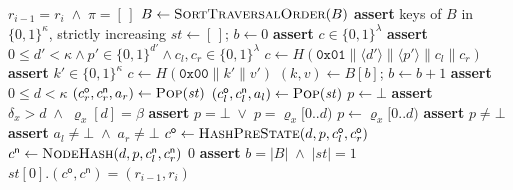 \documentclass[twocolumn]{article}
\begin{document}
\begin{algorithm}[H]
  \caption{Stack-machine verification of the RSMT consistency proof, complete}\label{alg:stackverify}
  \scriptsize
  \begin{algorithmic}[0]
        \State \Return $r_{i-1} = r_i \;\land\; \pi = [\,]$
      \EndIf
      \State $B \gets \Call{SortTraversalOrder}{B}$
      \State \textbf{assert} keys of $B$ in $\{0,1\}^{\kappa}$, strictly increasing
      \State $\mathit{st} \gets [\,]$; \quad $b \gets 0$ 
         
          \State \textbf{assert} $c \in \{0,1\}^{\lambda}$
          \State {}
         
          \State \textbf{assert} $0 \le d' < \kappa \land p' \in \{0,1\}^{d'} \land c_l, c_r \in \{0,1\}^{\lambda}$
          \State $c \gets H(\texttt{0x01} \| \langle d'\rangle \| \langle p'\rangle \| c_l \| c_r)$
          \State {}
         
          \State \textbf{assert} $k' \in \{0,1\}^{\kappa}$
          \State $c \gets H(\texttt{0x00} \| k' \| v')$
          \State {}
         
          \State $(k, v) \gets B[b]$; \quad $b \gets b + 1$
          \State {}
         
          \State \textbf{assert} $0 \le d < \kappa$
          \State $(c^{\mathsf o}_r, c^{\mathsf n}_r, a_r) \gets \Call{Pop}{\mathit{st}}$
          \State $(c^{\mathsf o}_l, c^{\mathsf n}_l, a_l) \gets \Call{Pop}{\mathit{st}}$
          \State $p \gets \bot$
             
              \State \textbf{assert} $\delta_x > d \;\land\; \varrho_x[d] = \beta$
              \State \textbf{assert} $p = \bot \;\lor\; p = \varrho_x[0..d)$
              \State $p \gets \varrho_x[0..d)$
            \EndIf
          \EndFor
          \State \textbf{assert} $p \neq \bot$
           
            \State \textbf{assert} $a_l \neq \bot \;\land\; a_r \neq \bot$
          \EndIf
          \State $c^{\mathsf o} \gets \Call{HashPreState}{d,p,c^{\mathsf o}_l,c^{\mathsf o}_r}$
          \State $c^{\mathsf n} \gets \Call{NodeHash}{d,p,c^{\mathsf n}_l,c^{\mathsf n}_r}$
          \State {}
        \Else
          \State \Return $0$ 
        \EndIf
      \EndFor
      \State \textbf{assert} $b = |B| \;\land\; |\mathit{st}| = 1$
      \State \Return $\mathit{st}[0].(c^{\mathsf o}, c^{\mathsf n}) = (r_{i-1}, r_i)$
    \EndFunction
  \end{algorithmic}
\end{algorithm}



\end{document}
